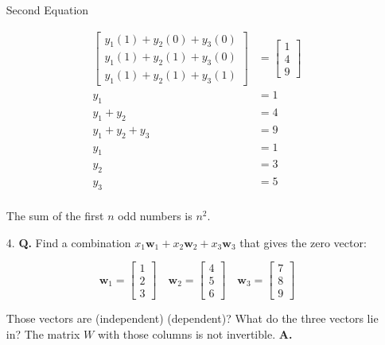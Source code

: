 \documentclass[main.tex]{subfiles}
\begin{document}
\begin{enumerate}
        Second Equation

        $$
        \begin{aligned}
        \left[\begin{array}{l}
        y_{1}(1)+y_{2}(0)+y_{3}(0) \\
        y_{1}(1)+y_{2}(1)+y_{3}(0) \\
        y_{1}(1)+y_{2}(1)+y_{3}(1)
        \end{array}\right] & =\left[\begin{array}{l}
        1 \\
        4 \\
        9
        \end{array}\right] \\
        y_{1} & =1 \\
        y_{1}+y_{2} & =4 \\
        y_{1}+y_{2}+y_{3} & = 9 \\
        y_{1} & = 1 \\
        y_{2} & = 3 \\
        y_{3} & = 5 \\
        \end{aligned}
        $$
        
        The sum of the first $n$ odd numbers is $n^2$.
        
        \item [4.] \textbf{Q.} Find a combination $x_{1} \bm{w}_{1} + x_{2} \bm{w}_{2} + x_{3} \bm{w}_{3}$ that gives the zero vector:
        
        $$
        \bm{w}_{1}=\left[\begin{array}{l}
        1 \\
        2 \\
        3
        \end{array}\right] \quad \bm{w}_{2}=\left[\begin{array}{l}
        4 \\
        5 \\
        6
        \end{array}\right] \quad \bm{w}_{3}=\left[\begin{array}{l}
        7 \\
        8 \\
        9
        \end{array}\right]
        $$
        
        Those vectors are (independent) (dependent)? What do the three vectors lie in? The matrix $W$ with those columns is not invertible. \textbf{A.}
        

\end{enumerate}
\end{document}

